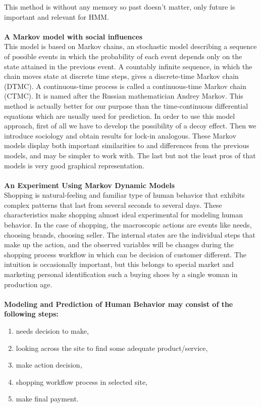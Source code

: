This method is without any memory so past doesn't matter, only future is important and relevant for HMM.\\
\\
\textbf{A Markov model with social influences} \label{subsec:markov}\\
This model is based on Markov chains, an stochastic model describing a sequence of possible events in which the probability
of each event depends only on the state attained in the previous event.
A countably infinite sequence, in which the chain moves
state at discrete time steps, gives a discrete-time Markov chain (DTMC).
A continuous-time process is called a continuous-time Markov chain (CTMC).
It is named after the Russian mathematician Andrey Markov.
This method is actually better for our purpose than the time-continuous differential equations which are usually used for prediction.
In order to use this model approach, first of all we have to develop the possibility of a decoy effect.
Then we introduce sociology and obtain results for lock-in analogous.
These Markov models display both important similarities to and differences from the previous models, and may be simpler to work with.
The last but not the least pros of that models is very good graphical representation.\\
\\
\textbf{An Experiment Using Markov Dynamic Models} \label{subsec:markov_dynamic}\\
Shopping is natural-feeling and familiar type of human behavior that exhibits complex patterns that last from several seconds to several days.
These characteristics make shopping almost ideal experimental for modeling human behavior.
In the case of shopping, the macroscopic actions are events like needs, choosing brands, choosing seller.
The internal states are the individual steps that make up the action, and the observed variables will be changes during the shopping
process workflow in which can be decision of customer different.
The intuition is occasionally important, but this belongs to special market and marketing personal identification such a buying shoes by a single woman in production age.\\
\\
\textbf{Modeling and Prediction of Human Behavior may consist of the following steps:}\\
\begin{enumerate}
	\item needs decision to make,
	\item looking across the site to find some adequate product/service,
	\item make action decision,
	\item shopping workflow process in selected site,
	\item make final payment.
\end{enumerate}
